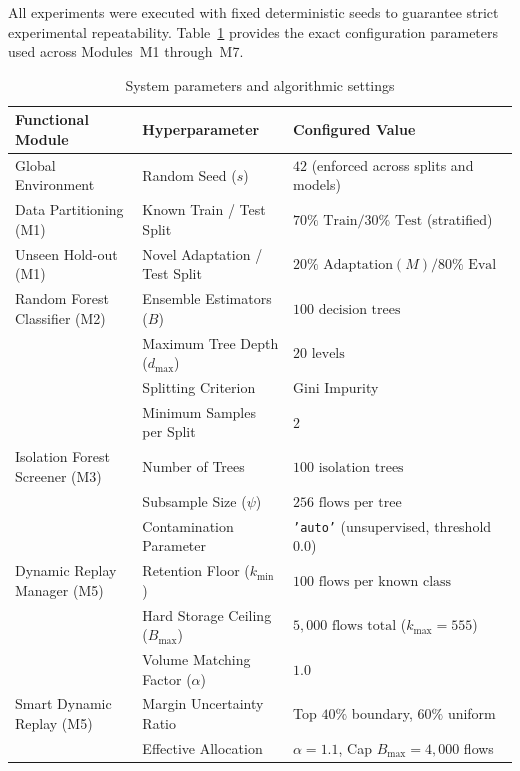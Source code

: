 All experiments were executed with fixed deterministic seeds to guarantee strict experimental repeatability. Table~\ref{tab:appendix_hyperparams} provides the exact configuration parameters used across Modules~M1 through~M7.

\begin{table}[htpb]
\centering
\small
\renewcommand{\arraystretch}{1.3}
\caption{System parameters and algorithmic settings}
\label{tab:appendix_hyperparams}
\begin{tabular}{|p{4.0cm}|p{4.2cm}|p{4.6cm}|}
\hline
\textbf{Functional Module} & \textbf{Hyperparameter} & \textbf{Configured Value} \\ \hline
Global Environment & Random Seed ($s$) & $42$ (enforced across splits and models) \\ \hline
Data Partitioning (M1) & Known Train / Test Split & $70\% \text{ Train} / 30\% \text{ Test}$ (stratified) \\ \hline
Unseen Hold-out (M1) & Novel Adaptation / Test Split & $20\% \text{ Adaptation} (M) / 80\% \text{ Eval}$ \\ \hline
Random Forest Classifier (M2) & Ensemble Estimators ($B$) & $100\text{ decision trees}$ \\ 
& Maximum Tree Depth ($d_{\max}$) & $20\text{ levels}$ \\
& Splitting Criterion & Gini Impurity \\
& Minimum Samples per Split & $2$ \\ \hline
Isolation Forest Screener (M3) & Number of Trees & $100\text{ isolation trees}$ \\
& Subsample Size ($\psi$) & $256\text{ flows per tree}$ \\
& Contamination Parameter & \texttt{'auto'} (unsupervised, threshold $0.0$) \\ \hline
Dynamic Replay Manager (M5) & Retention Floor ($k_{\min}$) & $100\text{ flows per known class}$ \\
& Hard Storage Ceiling ($B_{\max}$) & $5{,}000\text{ flows total}$ ($k_{\max} = 555$) \\
& Volume Matching Factor ($\alpha$) & $1.0$ \\ \hline
Smart Dynamic Replay (M5) & Margin Uncertainty Ratio & Top $40\%$ boundary, $60\%$ uniform \\
& Effective Allocation & $\alpha = 1.1$, Cap $B_{\max} = 4{,}000$ flows \\ \hline
\end{tabular}
\end{table}

